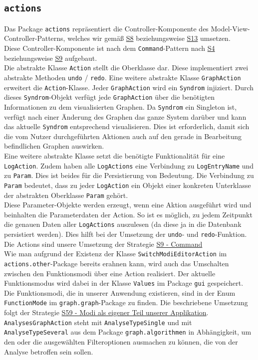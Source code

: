 \documentclass[enabledeprecatedfontcommands,fontsize=11pt,paper=a4,twoside]{scrartcl}
\newcounter{one}
\begin{document}
	
	
	\subsection{\texttt{actions}}
	Das Package \texttt{actions} repräsentiert die Controller-Komponente des Model-View-Controller-Patterns, welches wir gemäß \hyperlink{bbb}{S8} beziehungsweise \hyperlink{modelviewcontroller}{S13} umsetzen. \\ 
	Diese Controller-Komponente ist nach dem \texttt{Command}-Pattern nach \hyperlink{zz}{S4} beziehungsweise \hyperlink{command}{S9} aufgebaut. \\
	
	Die abstrakte Klasse \texttt{Action} stellt die Oberklasse dar. Diese implementiert zwei abstrakte Methoden \texttt{undo} / \texttt{redo}. Eine weitere abstrakte Klasse \texttt{GraphAction} erweitert die \texttt{Action}-Klasse. Jeder \texttt{GraphAction} wird ein \texttt{Syndrom} injiziert. Durch dieses \texttt{Syndrom}-Objekt verfügt jede \texttt{GraphAction} über die benötigten Informationen zu dem visualisierten Graphen. Da \texttt{Syndrom} ein Singleton ist, verfügt nach einer Änderung des Graphen das ganze System darüber und kann das aktuelle \texttt{Syndrom} entsprechend visualisieren.  Dies ist erforderlich, damit sich die vom Nutzer durchgeführten Aktionen auch auf den gerade in Bearbeitung befindlichen Graphen auswirken.\\ 
	Eine weitere abstrakte Klasse setzt die benötigte Funktionalität für eine \texttt{LogAction}. Zudem haben alle \texttt{LogActions} eine Verbindung zu \texttt{LogEntryName} und zu \texttt{Param}. Dies ist beides für die Persistierung von Bedeutung. Die Verbindung zu \texttt{Param} bedeutet, dass zu jeder \texttt{LogAction} ein Objekt einer konkreten Unterklasse der abstrakten Oberklasse \texttt{Param} gehört. \\
	Diese Parameter-Objekte werden erzeugt, wenn eine Aktion ausgeführt wird und beinhalten die Parameterdaten der Action. So ist es möglich, zu jedem Zeitpunkt die genauen Daten aller \texttt{LogActions} auszulesen (da diese ja in die Datenbank persistiert werden). Dies hilft bei der Umsetzung der \texttt{undo}- und \texttt{redo}-Funktion. Die Actions sind unsere Umsetzung der Strategie \hyperlink{command}{S9 - Command}  \\
	
	
	Wie man aufgrund der Existenz der Klasse \texttt{SwitchModiEditorAction} im \texttt{actions.other}-Package bereits erahnen kann, wird auch das Umschalten zwischen den Funktionsmodi über eine Action realisiert. Der aktuelle Funktionsmodus wird dabei in der Klasse \texttt{Values} im Package \texttt{gui} gespeichert.  Die Funktionsmodi, die in unserer Anwendung existieren, sind in der Enum \texttt{FunctionMode} im \texttt{graph.graph}-Package zu finden. Die beschriebene Umsetzung folgt der Strategie \hyperlink{uuu}{S59 - Modi als eigener Teil unserer Applikation}.
	\texttt{AnalysesGraphAction} steht mit \texttt{AnalyseTypeSingle} und mit \texttt{AnalyseTypeSeveral} aus dem Package \texttt{graph.algorithmen} in Abhängigkeit, um den oder die ausgewählten Filteroptionen ausmachen zu können, die von der Analyse betroffen sein sollen. \\
	
\end{document}
